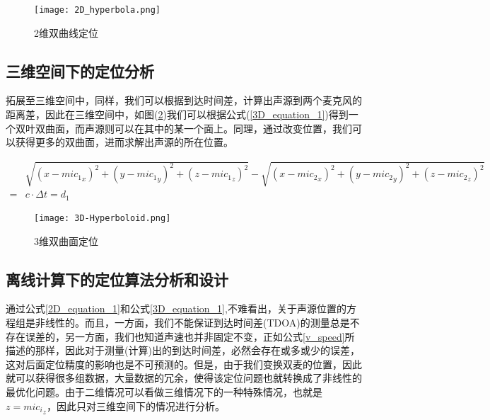 \documentclass[winfonts]{njuthesis}
\begin{document}
		\begin{figure}[H]
			\centering
			\texttt{[image: 2D\_hyperbola.png]} 
			\caption{2维双曲线定位}
			\label{fig: 2D_hyperbola}
		\end{figure}		
		
		\subsection{三维空间下的定位分析}
		
		拓展至三维空间中，同样，我们可以根据到达时间差，计算出声源到两个麦克风的距离差，因此在三维空间中，如图(\ref{fig: 3D-Hyperboloid})我们可以根据公式(\ref{3D_equation_1})得到一个双叶双曲面，而声源则可以在其中的某一个面上。同理，通过改变位置，我们可以获得更多的双曲面，进而求解出声源的所在位置。
		
		\begin{equation}
		\begin{aligned}
			&\sqrt{(x-{mic_1}_x)^2+(y-{mic_1}_y)^2+(z-{mic_1}_z)^2} - \sqrt{(x-{mic_2}_x)^2+(y-{mic_2}_y)^2+(z-{mic_2}_z)^2}\\
		  = & c \cdot \Delta t= d_1 \label{3D_equation_1}
		\end{aligned}
		\end{equation}
		
		\begin{figure}[H]
			\centering
			\texttt{[image: 3D-Hyperboloid.png]} 
			\caption{3维双曲面定位}
			\label{fig: 3D-Hyperboloid}
		\end{figure}	
		
		\subsection{离线计算下的定位算法分析和设计}
		
		通过公式\ref{2D_equation_1}和公式\ref{3D_equation_1},不难看出，关于声源位置的方程组是非线性的。而且，一方面，我们不能保证到达时间差(TDOA)的测量总是不存在误差的，另一方面，我们也知道声速也并非固定不变，正如公式\ref{v_speed}所描述的那样，因此对于测量(计算)出的到达时间差，必然会存在或多或少的误差，这对后面定位精度的影响也是不可预测的。但是，由于我们变换双麦的位置，因此就可以获得很多组数据，大量数据的冗余，使得该定位问题也就转换成了非线性的最优化问题。由于二维情况可以看做三维情况下的一种特殊情况，也就是$z = {mic_i}_z$，因此只对三维空间下的情况进行分析。
		
\end{document}
